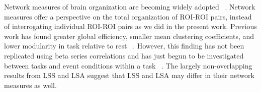 \documentclass[10pt,letterpaper]{article}
\begin{document}
Network measures of brain organization are becoming widely adopted ~\cite{Rubinov2010}.
Network measures offer a perspective on the total organization of ROI-ROI pairs, instead of
interrogating individual ROI-ROI pairs as we did in the present work.
Previous work has found greater global efficiency, smaller mean clustering coefficients, and lower modularity in
task relative to rest ~\cite{Di2013}.
However, this finding has not been replicated using beta series correlations and has just begun
to be investigated between tasks and event conditions within a task ~\cite{Di2019a}.
The largely non-overlapping results from LSS and LSA suggest that LSS and LSA may differ
in their network measures as well.

\end{document}
